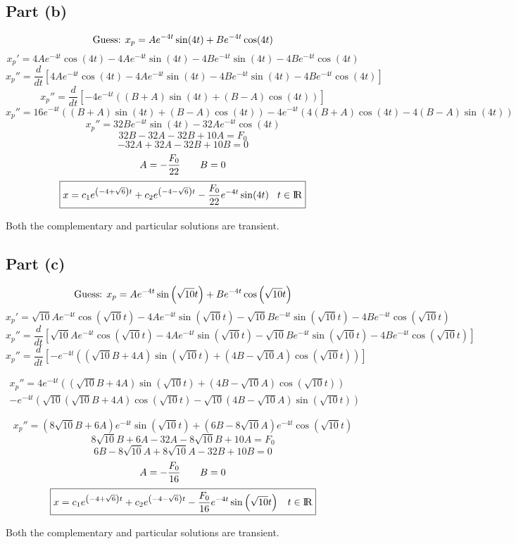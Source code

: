 \documentclass{article}
\begin{document}
\subsection*{Part (b)}
\[\textnormal{Guess: }x_p=Ae^{-4t}\sin(4t)+Be^{-4t}\cos(4t)\]
\[x_p'=4Ae^{-4t}\cos(4t)-4Ae^{-4t}\sin(4t)-4Be^{-4t}\sin(4t)-4Be^{-4t}\cos(4t)\]
\[x_p''=\frac{d}{dt}\left[4Ae^{-4t}\cos(4t)-4Ae^{-4t}\sin(4t)-4Be^{-4t}\sin(4t)-4Be^{-4t}\cos(4t)\right]\]
\[x_p''=\frac{d}{dt}\left[-4e^{-4t}((B+A)\sin(4t)+(B-A)\cos(4t))\right]\]
\[x_p''=16e^{-4t}((B+A)\sin(4t)+(B-A)\cos(4t))-4e^{-4t}(4(B+A)\cos(4t)-4(B-A)\sin(4t))\]
\[x_p''=32Be^{-4t}\sin(4t)-32Ae^{-4t}\cos(4t)\]
\[32B-32A-32B+10A=F_0\]
\[-32A+32A-32B+10B=0\]
\[A=-\frac{F_0}{22}\hspace{7 mm}B=0\]
\[\boxed{x=c_1e^{\left(-4+\sqrt{6}\right)t}+c_2e^{\left(-4-\sqrt{6}\right)t}-\frac{F_0}{22}e^{-4t}\sin(4t)\hspace{3 mm}t\in{\rm I\!R}}\]
\begin{center}
Both the complementary and particular solutions are transient.
\end{center}
\subsection*{Part (c)}
\[\textnormal{Guess: }x_p=Ae^{-4t}\sin\left(\sqrt{10}t\right)+Be^{-4t}\cos\left(\sqrt{10}t\right)\]
\[x_p'=\sqrt{10}Ae^{-4t}\cos\left(\sqrt{10}t\right)-4Ae^{-4t}\sin\left(\sqrt{10}t\right)-\sqrt{10}Be^{-4t}\sin\left(\sqrt{10}t\right)-4Be^{-4t}\cos\left(\sqrt{10}t\right)\]
\[x_p''=\frac{d}{dt}\left[\sqrt{10}Ae^{-4t}\cos\left(\sqrt{10}t\right)-4Ae^{-4t}\sin\left(\sqrt{10}t\right)-\sqrt{10}Be^{-4t}\sin\left(\sqrt{10}t\right)-4Be^{-4t}\cos\left(\sqrt{10}t\right)\right]\]
\[x_p''=\frac{d}{dt}\left[-e^{-4t}\left(\left(\sqrt{10}B+4A\right)\sin\left(\sqrt{10}t\right)+\left(4B-\sqrt{10}A\right)\cos\left(\sqrt{10}t\right)\right)\right]\]
\begin{center}
\begin{multline*}
x_p''=4e^{-4t}\left(\left(\sqrt{10}B+4A\right)\sin\left(\sqrt{10}t\right)+\left(4B-\sqrt{10}A\right)\cos\left(\sqrt{10}t\right)\right)\\
-e^{-4t}\left(\sqrt{10}\left(\sqrt{10}B+4A\right)\cos\left(\sqrt{10}t\right)-\sqrt{10}\left(4B-\sqrt{10}A\right)\sin\left(\sqrt{10}t\right)\right)
\end{multline*}
\end{center}
\[x_p''=\left(8\sqrt{10}B+6A\right)e^{-4t}\sin\left(\sqrt{10}t\right)+\left(6B-8\sqrt{10}A\right)e^{-4t}\cos\left(\sqrt{10}t\right)\]
\[8\sqrt{10}B+6A-32A-8\sqrt{10}B+10A=F_0\]
\[6B-8\sqrt{10}A+8\sqrt{10}A-32B+10B=0\]
\[A=-\frac{F_0}{16}\hspace{7 mm}B=0\]
\[\boxed{x=c_1e^{\left(-4+\sqrt{6}\right)t}+c_2e^{\left(-4-\sqrt{6}\right)t}-\frac{F_0}{16}e^{-4t}\sin\left(\sqrt{10}t\right)\hspace{3 mm}t\in{\rm I\!R}}\]
\begin{center}
Both the complementary and particular solutions are transient.
\end{center}
\end{document}
